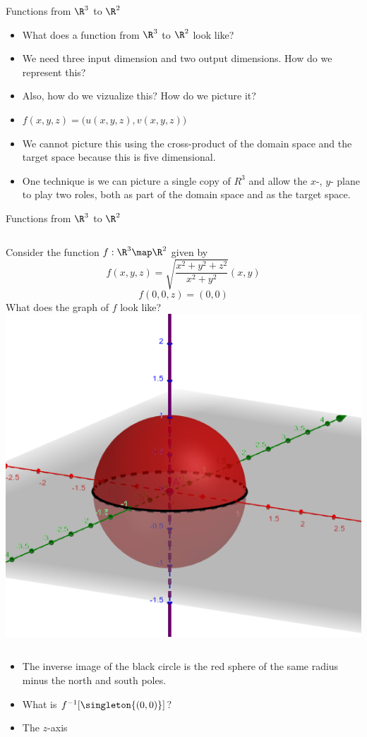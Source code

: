 \documentclass{beamer}
\begin{document}
\begin{frame}{Functions from $\R^3$ to $\R^2$}

\begin{itemize}
\item What does a function from $\R^3$ to $\R^2$ look like?
\item We need three input dimension and two output dimensions.
How do we represent this?
\item Also, how do we vizualize this? How do we picture it?
\item $f(x,y,z) = \big( u(x,y,z), v(x,y,z) \big)$
\item We cannot picture this using the cross-product of the domain space
and the target space because this is five dimensional.
\item One technique is we can picture a single copy of $R^3$ and allow the
$x$-, $y$- plane to play two roles, both as part of the domain space and as
the target space.
\end{itemize}
\end{frame}

\begin{frame}{Functions from $\R^3$ to $\R^2$}

\begin{columns}
\column[T]{5cm}
Consider the function $f:\R^3\map\R^2$ given by
$$f(x,y, z) = \sqrt{\frac{x^2 + y^2 + z^2}{x^2+y^2}}(x, y)$$
$$f(0,0, z) = (0,0)$$
What does the graph of $f$ look like?
\column[T]{5cm}
\includegraphics[scale=0.25]{sphere2}
\end{columns}

\begin{itemize}
\item The inverse image of the black circle is the red sphere of the same radius
minus the north and south poles.
\item What is $f^{-1}[\singleton{(0,0)}]$?
\item The $z$-axis
\end{itemize}
\end{frame}
\end{document}
